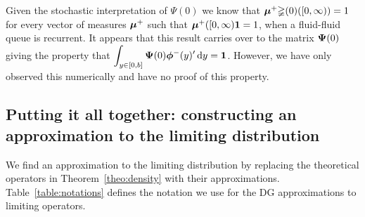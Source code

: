 \begin{rem}
	Given the stochastic interpretation of \(\mathbb\Psi(0)\) we know that \( \boldsymbol \mu^+ \mathbb\Psi(0)([0,\infty))=1\) for every vector of measures \( \boldsymbol \mu^+\) such that \( \boldsymbol \mu^+([0,\infty)\boldsymbol 1 = 1\), when a fluid-fluid queue is recurrent. It appears that this result carries over to the matrix \(\boldsymbol \Psi(0)\) giving the property that \(\displaystyle\int_{y\in[0,b]} \boldsymbol \Psi(0)\boldsymbol\phi^-(y)'{}\, \mathrm{d} y = \boldsymbol 1\). However, we have only observed this numerically and have no proof of this property. 
\end{rem}

\subsection{Putting it all together: constructing an approximation to the limiting distribution}
We find an approximation to the limiting distribution by replacing the theoretical operators in Theorem~\ref{theo:density} with their approximations. Table~\ref{table:notations} defines the notation we use for the DG approximations to limiting operators. 


